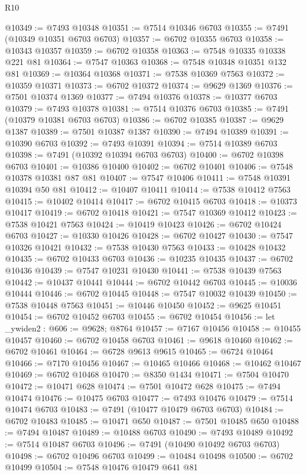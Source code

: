 \begin{lexlean}{R10}
\begin{coremodule}
@10349 := @7493 @10348
@10351 := @7514 @10346 @6703
@10355 := @7491 (@10349 @10351 @6703 @6703)
@10357 := @6702 @10355 @6703
@10358 := @10343 @10357
@10359 := @6702 @10358
@10363 := @7548 @10335 @10338 @221 @81
@10364 := @7547 @10363
@10368 := @7548 @10348 @10351 @132 @81
@10369 := @10364 @10368
@10371 := @7538 @10369 @7563
@10372 := @10359 @10371
@10373 := @6702 @10372
@10374 := @9629 @1369
@10376 := @7501 @10374 @1369
@10377 := @7494 @10376
@10378 := @10377 @6703
@10379 := @7493 @10378
@10381 := @7514 @10376 @6703
@10385 := @7491 (@10379 @10381 @6703 @6703)
@10386 := @6702 @10385
@10387 := @9629 @1387
@10389 := @7501 @10387 @1387
@10390 := @7494 @10389
@10391 := @10390 @6703
@10392 := @7493 @10391
@10394 := @7514 @10389 @6703
@10398 := @7491 (@10392 @10394 @6703 @6703)
@10400 := @6702 @10398 @6703
@10401 := @10386 @10400
@10402 := @6702 @10401
@10406 := @7548 @10378 @10381 @87 @81
@10407 := @7547 @10406
@10411 := @7548 @10391 @10394 @50 @81
@10412 := @10407 @10411
@10414 := @7538 @10412 @7563
@10415 := @10402 @10414
@10417 := @6702 @10415 @6703
@10418 := @10373 @10417
@10419 := @6702 @10418
@10421 := @7547 @10369 @10412
@10423 := @7538 @10421 @7563
@10424 := @10419 @10423
@10426 := @6702 @10424 @6703
@10427 := @10330 @10426
@10428 := @6702 @10427
@10430 := @7547 @10326 @10421
@10432 := @7538 @10430 @7563
@10433 := @10428 @10432
@10435 := @6702 @10433 @6703
@10436 := @10235 @10435
@10437 := @6702 @10436
@10439 := @7547 @10231 @10430
@10441 := @7538 @10439 @7563
@10442 := @10437 @10441
@10444 := @6702 @10442 @6703
@10445 := @10036 @10444
@10446 := @6702 @10445
@10448 := @7547 @10032 @10439
@10450 := @7538 @10448 @7563
@10451 := @10446 @10450
@10452 := @9625 @10451
@10454 := @6702 @10452 @6703
@10455 := @6702 @10454
@10456 := let _ywiden2 : @606 := @9628; @8764
@10457 := @7167 @10456
@10458 := @10455 @10457
@10460 := @6702 @10458 @6703
@10461 := @9618 @10460
@10462 := @6702 @10461
@10464 := @6728 @9613 @9615
@10465 := @6724 @10464
@10466 := @7170 @10456
@10467 := @10465 @10466
@10468 := @10462 @10467
@10469 := @6702 @10468
@10470 := @8350 @1434
@10471 := @7504 @10470
@10472 := @10471 @628
@10474 := @7501 @10472 @628
@10475 := @7494 @10474
@10476 := @10475 @6703
@10477 := @7493 @10476
@10479 := @7514 @10474 @6703
@10483 := @7491 (@10477 @10479 @6703 @6703)
@10484 := @6702 @10483
@10485 := @10471 @650
@10487 := @7501 @10485 @650
@10488 := @7494 @10487
@10489 := @10488 @6703
@10490 := @7493 @10489
@10492 := @7514 @10487 @6703
@10496 := @7491 (@10490 @10492 @6703 @6703)
@10498 := @6702 @10496 @6703
@10499 := @10484 @10498
@10500 := @6702 @10499
@10504 := @7548 @10476 @10479 @641 @81

\end{coremodule}
\end{lexlean}

